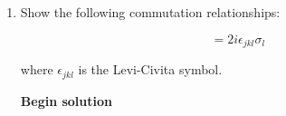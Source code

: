 \documentclass[11pt]{article}
\begin{document}
\begin{enumerate}
\begin{enumerate}
		            \begin{align*}
			            \sigma_1 \sigma_3                     & =
			            \begin{bmatrix} 0 & 1 \\ 1 & 0 \end{bmatrix}
			            \begin{bmatrix} 1 & 0 \\ 0 & -1 \end{bmatrix} =
			            \begin{bmatrix}
				            0 & -1 \\ 1 & 0
			            \end{bmatrix}                           \\
			            \sigma_3 \sigma_1                     & =
			            \begin{bmatrix} 1 & 0 \\ 0 & -1 \end{bmatrix} =
			            \begin{bmatrix} 0 & 1 \\ 1 & 0 \end{bmatrix}
			            \begin{bmatrix}
				            0 & 1 \\ -1 & 0
			            \end{bmatrix}                           \\
			            \sigma_1 \sigma_3 + \sigma_3 \sigma_1 & =
			            \begin{bmatrix}
				            0 & -1 \\ 1 & 0
			            \end{bmatrix} +
			            \begin{bmatrix}
				            0 & 1 \\ -1 & 0
			            \end{bmatrix} = 0
		            \end{align*}


		      \item Show the following commutation relationships:

		            \begin{equation*}
			            [\sigma_j, \sigma_k] = 2i\epsilon_{jkl} \sigma_l
		            \end{equation*}

		            where $\epsilon_{jkl}$ is the Levi-Civita symbol.

		            \textbf{Begin solution}


\end{enumerate}
\end{enumerate}
\end{document}
